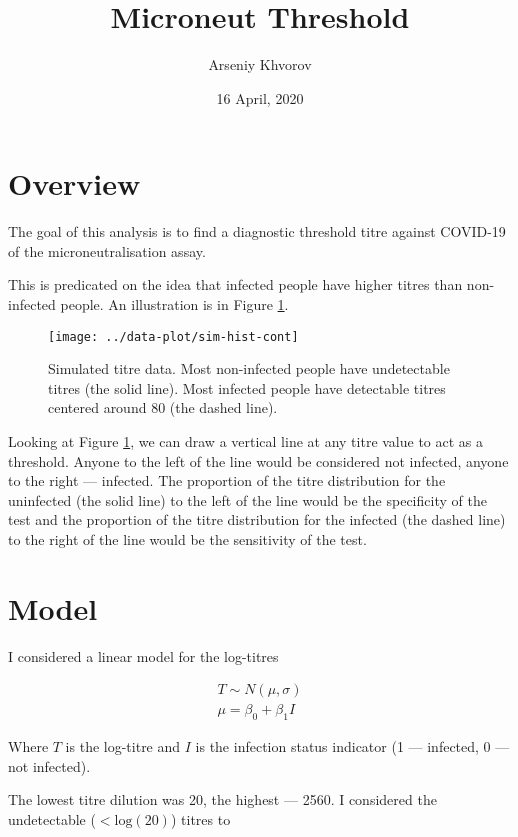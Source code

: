 \documentclass[]{article}
\title{Microneut Threshold}
\author{Arseniy Khvorov}
\date{16 April, 2020}
\begin{document}
\maketitle

\section{Overview}\label{overview}

The goal of this analysis is to find a diagnostic threshold titre
against COVID-19 of the microneutralisation assay.

This is predicated on the idea that infected people have higher titres
than non-infected people. An illustration is in Figure
\ref{fig:sim-hist-cont}.





\begin{figure}

{\centering \texttt{[image: ../data-plot/sim-hist-cont]} 

}

\caption{Simulated titre data. Most non-infected people have
undetectable titres (the solid line). Most infected people have
detectable titres centered around 80 (the dashed line).}\label{fig:sim-hist-cont}
\end{figure}

Looking at Figure \ref{fig:sim-hist-cont}, we can draw a vertical line
at any titre value to act as a threshold. Anyone to the left of the line
would be considered not infected, anyone to the right --- infected. The
proportion of the titre distribution for the uninfected (the solid line)
to the left of the line would be the specificity of the test and the
proportion of the titre distribution for the infected (the dashed line)
to the right of the line would be the sensitivity of the test.

\section{Model}\label{model}

I considered a linear model for the log-titres

\begin{gather*}
T \sim N(\mu, \sigma) \\
\mu = \beta_0 + \beta_1 I
\end{gather*}

Where \(T\) is the log-titre and \(I\) is the infection status indicator
(1 --- infected, 0 --- not infected).

The lowest titre dilution was 20, the highest --- 2560. I considered the
undetectable (\(<\text{log}(20)\)) titres to
\end{document}

